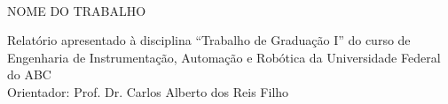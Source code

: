   \begin{center}
  \thispagestyle{empty}
   {\large \textbf{\theauthor}} \\[6cm]



   {\Large NOME DO TRABALHO}\\[6cm]

   \hspace{.25\textwidth} %
   \begin{minipage}{.7\textwidth}
   \large Relatório apresentado à disciplina “Trabalho de
   Graduação I” do curso de Engenharia
   de Instrumentação, Automação e Robótica da Universidade Federal do
   ABC
   \\[1cm]
   Orientador: Prof. Dr. Carlos Alberto dos Reis Filho
  \end{minipage}
  \vfill
  

\vspace{2cm}

\large \textbf{\local}

\large \textbf{\thedate}
\end{center}
\newpage
